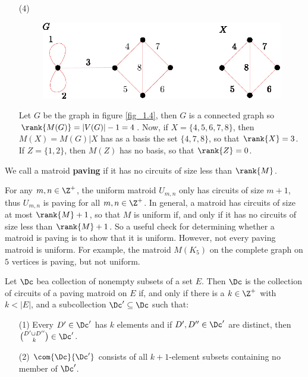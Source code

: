 \begin{example}
\begin{enumerate}
    \item[(4)]
         \begin{figure}[h]
            \centering
            \includegraphics[scale=1.0]{Figures/Chapter1/connected_graph_rank.eps}
            \caption{}
            \label{fig_1.5}
        \end{figure}
        Let $G$ be the graph in figure \ref{fig_1.4}, then $G$ is a connected
        graph so  $\rank{M(G)}=|V(G)|-1=4$. Now, if $X=\{4,5,6,7,8\}$, then
        $M(X)=M(G)|X$ has as a basis the set $\{4,7,8\}$, so that $\rank{X}=3$.
        If $Z=\{1,2\}$, then $M(Z)$ has no basis, so that $\rank{Z}=0$.
    \end{enumerate}
\end{example}

\begin{definition}
    We call a matroid \textbf{paving} if it has no circuits of size less than
    $\rank{M}$.
\end{definition}

\begin{example}\label{1.13}
    For any $m,n \in \Z^+$, the uniform matroid  $U_{m,n}$ only has circuits of
    size $m+1$, thus  $U_{m,n}$ is paving for all $m,n \in \Z^+$. In general, a
    matroid has circuits of size at most  $\rank{M}+1$, so that $M$ is uniform
    if, and only if it has no circuits of size less than $\rank{M}+1$. So a
    useful check for determining whether a matroid is paving is to show that it
    is uniform. However, not every paving matroid is uniform. For example, the
    matroid $M(K_5)$ on the complete graph on $5$ vertices is paving, but not
    uniform.
\end{example}

\begin{theorem}\label{1.3.5}
    Let $\Dc$ bea collection of nonempty subsets of a set $E$. Then  $\Dc$ is
    the collection of circuits of a paving matroid on  $E$ if, and only if there
    is a  $k \in \Z^+$ with  $k<|E|$, and a subcollection  $\Dc' \subseteq \Dc$
    such that:
    \begin{enumerate}
        \item[(1)] Every $D' \in \Dc'$ has  $k$ elements and if  $D',D'' \in
            \Dc'$ are distinct, then ${D' \cup D'' \choose k} \in \Dc'$.

        \item[(2)] $\com{\Dc}{\Dc'}$ consists of all $k+1$-element subsets
            containing no member of  $\Dc'$.
    \end{enumerate}
\end{theorem}
